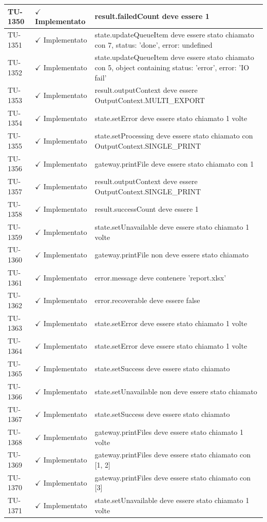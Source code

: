 ﻿\documentclass[a4paper,12pt]{article}
\newcommand{\ok}{\textcolor{green!60!black}{$\checkmark$ Implementato}}
\begin{document}
\begin{longtable}{|p{2cm}|p{3.5cm}|p{9.5cm}|}
\hline
TU-1350 & \ok & result.failedCount deve essere 1 \\
\hline
TU-1351 & \ok & state.updateQueueItem deve essere stato chiamato con 7, { status: 'done', error: undefined } \\
\hline
TU-1352 & \ok & state.updateQueueItem deve essere stato chiamato con 5, object containing { status: 'error', error: 'IO fail' } \\
\hline
TU-1353 & \ok & result.outputContext deve essere OutputContext.MULTI\_EXPORT \\
\hline
TU-1354 & \ok & state.setError deve essere stato chiamato 1 volte \\
\hline
TU-1355 & \ok & state.setProcessing deve essere stato chiamato con OutputContext.SINGLE\_PRINT \\
\hline
TU-1356 & \ok & gateway.printFile deve essere stato chiamato con 1 \\
\hline
TU-1357 & \ok & result.outputContext deve essere OutputContext.SINGLE\_PRINT \\
\hline
TU-1358 & \ok & result.successCount deve essere 1 \\
\hline
TU-1359 & \ok & state.setUnavailable deve essere stato chiamato 1 volte \\
\hline
TU-1360 & \ok & gateway.printFile non deve essere stato chiamato \\
\hline
TU-1361 & \ok & error.message deve contenere 'report.xlsx' \\
\hline
TU-1362 & \ok & error.recoverable deve essere false \\
\hline
TU-1363 & \ok & state.setError deve essere stato chiamato 1 volte \\
\hline
TU-1364 & \ok & state.setError deve essere stato chiamato 1 volte \\
\hline
TU-1365 & \ok & state.setSuccess deve essere stato chiamato \\
\hline
TU-1366 & \ok & state.setUnavailable non deve essere stato chiamato \\
\hline
TU-1367 & \ok & state.setSuccess deve essere stato chiamato \\
\hline
TU-1368 & \ok & gateway.printFiles deve essere stato chiamato 1 volte \\
\hline
TU-1369 & \ok & gateway.printFiles deve essere stato chiamato con [1, 2] \\
\hline
TU-1370 & \ok & gateway.printFiles deve essere stato chiamato con [3] \\
\hline
TU-1371 & \ok & state.setUnavailable deve essere stato chiamato 1 volte \\

\end{longtable}
\end{document}
